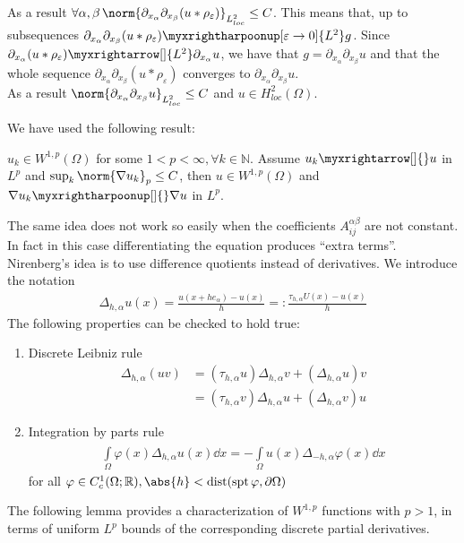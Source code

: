 As a result \( \forall \alpha ,\beta \, \norm{\partial_{x_{\alpha }}\partial_{x_{\beta}}(u\ast \rho _{\varepsilon })}_{L_{loc}^{2}} \leq  C \). This means that, up to subsequences \( \partial_{x_{\alpha }}\partial_{x_{\beta}}(u\ast \rho _{\varepsilon }) \myxrightharpoonup[\varepsilon  \to 0]{L^{2}} g\). Since \( \partial_{x_{\alpha }}(u\ast \rho _{\varepsilon }) \myxrightarrow[]{L^{2}} \partial_{x_{\alpha }} u \), we have that \( g = \partial_{x_{\alpha }}\partial_{x_{\beta}}u\) and that the whole sequence \( \partial_{x_{\alpha }}\partial_{x_{\beta}}(u\ast \rho _{\varepsilon }) \) converges to \( \partial_{x_{\alpha }}\partial_{x_{\beta}}u \). \\
As a result \( \norm{\partial_{x_{\alpha }}\partial_{x_{\beta}}u}_{L_{loc}^{2}} \leq  C \) and \( u \in H_{loc}^{2} (\Omega )  \).\\
\par

We have used the following result:
\begin{lem}
	\( u_{k}\in W^{1,p}(\Omega )\) for some \( 1 < p < \infty, \forall k \in  \mathbb{N} \). Assume \( u_{k} \myxrightarrow[]{} u  \) in \( L^{p} \) and \( \sup_{k}\norm{\nabla u_{k}}_{p}\leq C \), then \( u\in W^{1,p}(\Omega ) \) and \( \nabla u_{k} \myxrightharpoonup[]{} \nabla u \) in \( L^{p} \).
\end{lem}
The same idea does not work so easily when the coefficients \( A_{ij}^{\alpha \beta } \) are not constant. In fact in this case differentiating the equation produces \enquote{extra terms}.\\
Nirenberg's idea is to use difference quotients instead of derivatives. We introduce the notation
\begin{gather}
	\Delta _{h, \alpha }u(x) = \frac{u(x+he_{\alpha})-u(x)}{h} =: \frac{\tau _{h, \alpha }U(x)-u(x) }{h }
\end{gather}
The following properties can be checked to hold true:
\begin{enumerate}[label= \( \bullet \)  ]
	\item Discrete Leibniz rule
	      \begin{align}
		      \Delta _{h, \alpha }(uv)
		       & = (\tau _{h, \alpha } u) \Delta _{h,\alpha }v + (\Delta _{h, \alpha} u) v  \\
		       & =    (\tau _{h, \alpha } v) \Delta _{h,\alpha }u + (\Delta _{h, \alpha} v) u
	      \end{align}

	\item Integration by parts rule
	      \begin{gather}
		      \int\limits_{\Omega}^{} \varphi (x) \Delta _{h, \alpha } u(x)   \dd{x} = -\int\limits_{\Omega}^{} u(x) \Delta _{-h, \alpha }\varphi (x)    \dd{x}
	      \end{gather}
	      for all \( \varphi \in  C_{c}^{1} (\Omega ; \mathbb{R}), \abs{h}< \operatorname{dist}(\operatorname{spt} \varphi, \partial \Omega )  \)
\end{enumerate}
The following lemma provides a characterization of \( W^{1,p} \) functions with \( p>1 \), in terms of uniform \( L^{p} \) bounds of the corresponding discrete partial derivatives.

